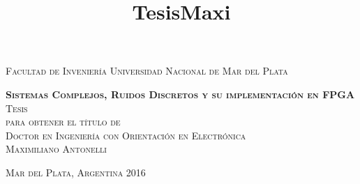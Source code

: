 

\title{TesisMaxi} %

\begin{titlepage}
\begin{center}

\textsc{\Large Facultad de Inveniería \- Universidad Nacional de Mar del Plata}\\[4em]

\vspace{4em}

\textsc{\huge \textbf{Sistemas Complejos, Ruidos Discretos y su implementación en FPGA}}\\[4em]

\textsc{\large Tesis}\\[1em]

\textsc{para obtener el título de}\\[1em]

\textsc{Doctor en Ingeniería con Orientación en Electrónica}\\[1em]


\textsc{\Large Maximiliano Antonelli}\\[1em]


\end{center}

\vspace*{\fill}
\textsc{Mar del Plata, Argentina \hspace*{\fill} 2016}

\end{titlepage}